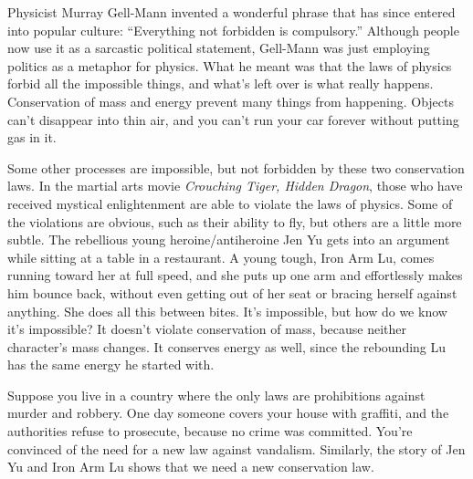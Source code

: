 \newcommand{\velocitytable}[8]{%
\noindent\hspace{5mm}\begin{tabular}{|p{4mm}|p{30mm}|p{30mm}|p{20mm}|}
\hline
 & \multicolumn{2}{p{50mm}}{velocity (meters per second)} & \\
\cline{2-4}
 & before the collision
       & after the collision  & change \\
\hline
\anonymousinlinefig{#7} & #1 & #2 & #3 \\
\anonymousinlinefig{#8} & #4 & #5 & #6 \\
\hline
\end{tabular}
}
%
\label{ch:momentum}

Physicist Murray Gell-Mann invented a wonderful phrase that has since
entered into popular culture: ``Everything not forbidden is compulsory.''
Although people now use it as a sarcastic political statement,
Gell-Mann was just employing politics as a metaphor for physics. What he meant
was that the laws of physics forbid all the impossible things, and what's
left over is what really happens.
Conservation of mass and energy prevent many things from happening. Objects
can't disappear into thin air, and you can't run your car forever without
putting gas in it.

Some other processes are impossible, but not forbidden
by these two conservation laws. 
In the martial arts movie \emph{Crouching Tiger, Hidden Dragon},
those who have received mystical enlightenment are able to violate the
laws of physics. Some of the violations are obvious, such as their ability
to fly, but others are a little more subtle. The rebellious young
heroine/antiheroine Jen Yu gets into an argument while sitting
at a table in a restaurant. A young tough, Iron Arm Lu, comes running toward her at full
speed, and she puts up one arm and effortlessly makes him bounce
back, without even getting out of her seat or bracing herself against
anything. She does all this between bites.
It's impossible, but how do we know it's impossible? It doesn't violate conservation
of mass, because neither character's mass changes. It conserves energy as well,
since the rebounding Lu has the same energy he started with.\label{tiger}

Suppose you live in a country where the only laws are prohibitions against
murder and robbery. One day someone covers your house with graffiti, and the
authorities refuse to prosecute, because no crime was committed. You're
convinced of the need for a new law against vandalism. Similarly, the story of
Jen Yu and Iron Arm Lu shows that we need a new conservation law.

